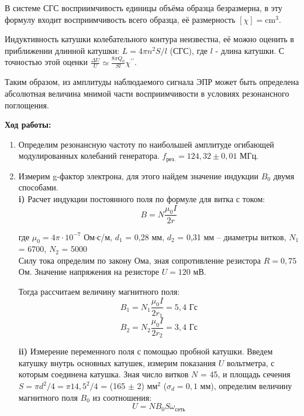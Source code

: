 \documentclass[a4paper, 12pt]{article}%
\begin{document}
	В системе СГС восприимчивость единицы объёма образца безразмерна, в эту формулу входит восприимчивость всего образца, её размерность $[\chi]=\mathrm{cm}^3$.
	
	Индуктивность катушки колебательного контура неизвестна, её можно оценить в приближении длинной катушки: $L=4 \pi n^2 S / l$ (СГС), где $l$ - длина катушки. С точностью этой оценки $\frac{\Delta U}{U} \simeq \frac{8 \pi Q_0}{S l} \chi^{\prime \prime}$.
	
	Таким образом, из амплитуды наблюдаемого сигнала ЭПР может быть определена абсолютная величина мнимой части восприимчивости в условиях резонансного поглощения.
	
	\newpage 
	
	\textbf{Ход работы: }\\
	
	\begin{enumerate}
		
		\item Определим резонансную частоту по наибольшей амплитуде огибающей модулированных колебаний генератора. $f_{\text{рез.}} = 124,32 \pm 0,01$ МГц.
		
		\item Измерим g-фактор электрона, для этого найдем значение индукции $B_0$ двумя способами. \\
		
		\textbf{i)} Расчет индукции постоянного поля по формуле для витка с током: 
		$$B= N\frac{\mu_0 I}{2r} $$
		
		где $\mu_0 = 4\pi \cdot 10^{-7}$ Ом$\cdot$с/м, $d_1$ = 0,28 мм,  $d_2$ = 0,31 мм -- диаметры витков, $N_1$ = 6700, $N_2$ = 5000\\
		Силу тока определим по закону Ома, зная сопротивление резистора $R = 0,75$ Ом. Значение напряжения на резисторе $U = 120$ мВ.
		
		Тогда рассчитаем величину магнитного поля:
		$$ B_1 = N_1\frac{\mu_0 I}{2r_1} = 5,4 \text{ Гс}$$
		$$ B_2 = N_2\frac{\mu_0 I}{2r_2} = 3,4 \text{ Гс}$$
				
		\textbf{ii)} Измерение переменного поля с помощью пробной катушки. Введем катушку внутрь основных катушек, измерим показания $U$ вольтметра, с которым соединена катушка. Зная число витков $N$ = 45, и площадь сечения $S = \pi d^2/4 = \pi 14,5^2 / 4 $ = (165 $\pm$ 2) мм$^2$ ($\sigma_d = 0,1$ мм), определим величину магнитного поля $B_0$ из соотношения:
		$$ U = NB_0S\omega_{\text{сеть}} $$
		

\end{enumerate}
\end{document}
